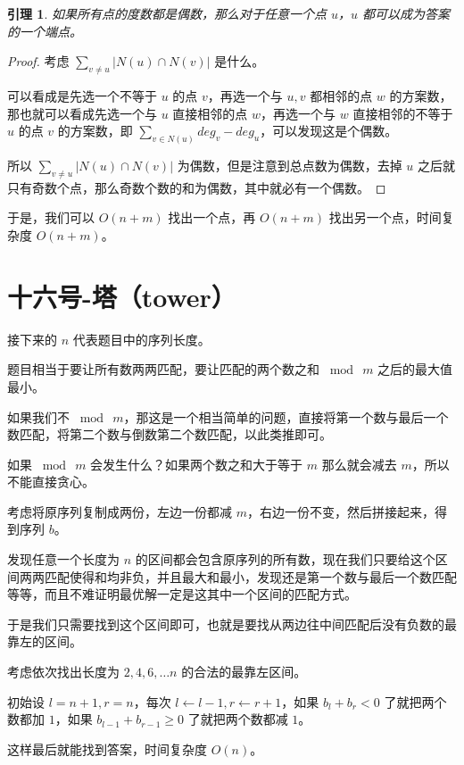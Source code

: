\documentclass[12pt]{article}
\newtheorem{lem}{引理}[section]
\newcommand{\fancyheadRightText}{}
\begin{document}
\begin{lem}
    如果所有点的度数都是偶数，那么对于任意一个点 $u$，$u$ 都可以成为答案的一个端点。
\end{lem}

\begin{proof}
    考虑 $\sum_{v\neq u}|N(u)\cap N(v)|$ 是什么。

    可以看成是先选一个不等于 $u$ 的点 $v$，再选一个与 $u,v$ 都相邻的点 $w$ 的方案数，那也就可以看成先选一个与 $u$ 直接相邻的点 $w$，再选一个与 $w$ 直接相邻的不等于 $u$ 的点 $v$ 的方案数，即 $\sum_{v\in N(u)}deg_v-deg_u$，可以发现这是个偶数。

    所以 $\sum_{v\neq u}|N(u)\cap N(v)|$ 为偶数，但是注意到总点数为偶数，去掉 $u$ 之后就只有奇数个点，那么奇数个数的和为偶数，其中就必有一个偶数。
\end{proof}

于是，我们可以 $O(n+m)$ 找出一个点，再 $O(n+m)$ 找出另一个点，时间复杂度 $O(n+m)$。

\newpage

\section{十六号-塔（tower）}
\fancyhead[R]{\footnotesize \fancyheadRightText\quad 十六号-塔（tower）}

接下来的 $n$ 代表题目中的序列长度。

题目相当于要让所有数两两匹配，要让匹配的两个数之和 $\bmod\ m$ 之后的最大值最小。

如果我们不 $\bmod\ m$，那这是一个相当简单的问题，直接将第一个数与最后一个数匹配，将第二个数与倒数第二个数匹配，以此类推即可。

如果 $\bmod\ m$ 会发生什么？如果两个数之和大于等于 $m$ 那么就会减去 $m$，所以不能直接贪心。

考虑将原序列复制成两份，左边一份都减 $m$，右边一份不变，然后拼接起来，得到序列 $b$。

发现任意一个长度为 $n$ 的区间都会包含原序列的所有数，现在我们只要给这个区间两两匹配使得和均非负，并且最大和最小，发现还是第一个数与最后一个数匹配等等，而且不难证明最优解一定是这其中一个区间的匹配方式。

于是我们只需要找到这个区间即可，也就是要找从两边往中间匹配后没有负数的最靠左的区间。

考虑依次找出长度为 $2,4,6,\dots n$ 的合法的最靠左区间。

初始设 $l=n+1,r=n$，每次 $l\leftarrow l-1,r\leftarrow r+1$，如果 $b_l+b_r<0$ 了就把两个数都加 $1$，如果 $b_{l-1}+b_{r-1}\ge 0$ 了就把两个数都减 $1$。

这样最后就能找到答案，时间复杂度 $O(n)$。
\end{document}
